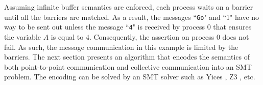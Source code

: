 Assuming infinite buffer semantics are enforced, each process waits on a barrier until all the barriers are matched. As a result, the messages ``\texttt{Go}" and ``1" have no way to be sent out unless the message ``\texttt{4}" is received by process $0$ that ensures the variable $A$ is equal to $4$. Consequently, the assertion on process $0$ does not fail. As such, the message communication in this example is limited by the barriers. The next section presents an algorithm that encodes the semantics of both point-to-point communication and collective communication into an SMT problem. The encoding can be solved by an SMT solver such as Yices \cite{dutertre:CAV06}, Z3 \cite{demoura:tacas08}, etc.





